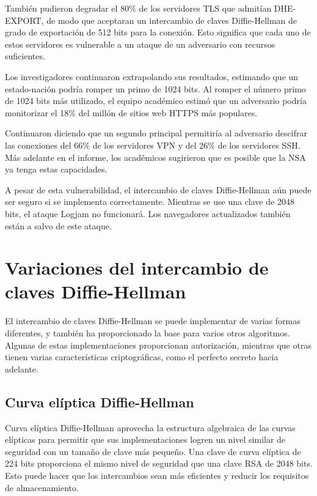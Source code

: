 \documentclass[11pt]{article}
\begin{document}
También pudieron degradar el 80$\%$ de los servidores TLS que admitían DHE-EXPORT, de modo que aceptaran un intercambio de claves Diffie-Hellman de grado de exportación de 512 bits para la conexión. Esto significa que cada uno de estos servidores es vulnerable a un ataque de un adversario con recursos suficientes.

Los investigadores continuaron extrapolando sus resultados, estimando que un estado-nación podría romper un primo de 1024 bits. Al romper el número primo de 1024 bits más utilizado, el equipo académico estimó que un adversario podría monitorizar el 18$\%$ del millón de sitios web HTTPS más populares.

Continuaron diciendo que un segundo principal permitiría al adversario descifrar las conexiones del 66$\%$ de los servidores VPN y del 26$\%$ de los servidores SSH. Más adelante en el informe, los académicos sugirieron que es posible que la NSA ya tenga estas capacidades.

A pesar de esta vulnerabilidad, el intercambio de claves Diffie-Hellman aún puede ser seguro si se implementa correctamente. Mientras se use una clave de 2048 bits, el ataque Logjam no funcionará. Los navegadores actualizados también están a salvo de este ataque.

\section{Variaciones del intercambio de claves Diffie-Hellman}

El intercambio de claves Diffie-Hellman se puede implementar de varias formas diferentes, y también ha proporcionado la base para varios otros algoritmos. Algunas de estas implementaciones proporcionan autorización, mientras que otras tienen varias características criptográficas, como el perfecto secreto hacia adelante.

\subsection{Curva elíptica Diffie-Hellman}
Curva elíptica Diffie-Hellman aprovecha la estructura algebraica de las curvas elípticas para permitir que sus implementaciones logren un nivel similar de seguridad con un tamaño de clave más pequeño. Una clave de curva elíptica de 224 bits proporciona el mismo nivel de seguridad que una clave RSA de 2048 bits. Esto puede hacer que los intercambios sean más eficientes y reducir los requisitos de almacenamiento.
\end{document}
